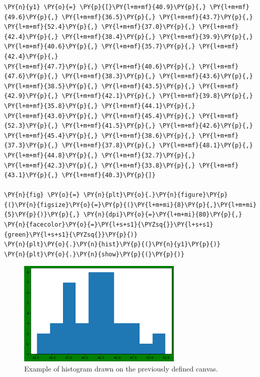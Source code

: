 \begin{tcolorbox}[breakable, size=fbox, boxrule=1pt, pad at break*=1mm,colback=cellbackground, colframe=cellborder]
\begin{Verbatim}[commandchars=\\\{\}]
\PY{n}{y1} \PY{o}{=} \PY{p}{[}\PY{l+m+mf}{40.9}\PY{p}{,} \PY{l+m+mf}{49.6}\PY{p}{,} \PY{l+m+mf}{36.5}\PY{p}{,} \PY{l+m+mf}{43.7}\PY{p}{,} \PY{l+m+mf}{52.4}\PY{p}{,} \PY{l+m+mf}{37.0}\PY{p}{,} \PY{l+m+mf}{42.4}\PY{p}{,} \PY{l+m+mf}{38.4}\PY{p}{,} \PY{l+m+mf}{39.9}\PY{p}{,} \PY{l+m+mf}{40.6}\PY{p}{,} \PY{l+m+mf}{35.7}\PY{p}{,} \PY{l+m+mf}{42.4}\PY{p}{,} 
\PY{l+m+mf}{47.7}\PY{p}{,} \PY{l+m+mf}{40.6}\PY{p}{,} \PY{l+m+mf}{47.6}\PY{p}{,} \PY{l+m+mf}{38.3}\PY{p}{,} \PY{l+m+mf}{43.6}\PY{p}{,} \PY{l+m+mf}{38.5}\PY{p}{,} \PY{l+m+mf}{43.5}\PY{p}{,} \PY{l+m+mf}{42.9}\PY{p}{,} \PY{l+m+mf}{42.1}\PY{p}{,} \PY{l+m+mf}{39.8}\PY{p}{,} \PY{l+m+mf}{35.8}\PY{p}{,} \PY{l+m+mf}{44.1}\PY{p}{,} 
\PY{l+m+mf}{43.0}\PY{p}{,} \PY{l+m+mf}{45.4}\PY{p}{,} \PY{l+m+mf}{52.3}\PY{p}{,} \PY{l+m+mf}{41.5}\PY{p}{,} \PY{l+m+mf}{42.6}\PY{p}{,} \PY{l+m+mf}{45.4}\PY{p}{,} \PY{l+m+mf}{38.6}\PY{p}{,} \PY{l+m+mf}{37.3}\PY{p}{,} \PY{l+m+mf}{37.8}\PY{p}{,} \PY{l+m+mf}{48.1}\PY{p}{,} \PY{l+m+mf}{44.8}\PY{p}{,} \PY{l+m+mf}{32.7}\PY{p}{,} 
\PY{l+m+mf}{42.3}\PY{p}{,} \PY{l+m+mf}{33.8}\PY{p}{,} \PY{l+m+mf}{43.1}\PY{p}{,} \PY{l+m+mf}{40.3}\PY{p}{]}
	
\PY{n}{fig} \PY{o}{=} \PY{n}{plt}\PY{o}{.}\PY{n}{figure}\PY{p}{(}\PY{n}{figsize}\PY{o}{=}\PY{p}{(}\PY{l+m+mi}{8}\PY{p}{,}\PY{l+m+mi}{5}\PY{p}{)}\PY{p}{,} \PY{n}{dpi}\PY{o}{=}\PY{l+m+mi}{80}\PY{p}{,} \PY{n}{facecolor}\PY{o}{=}\PY{l+s+s1}{\PYZsq{}}\PY{l+s+s1}{green}\PY{l+s+s1}{\PYZsq{}}\PY{p}{)}
\PY{n}{plt}\PY{o}{.}\PY{n}{hist}\PY{p}{(}\PY{n}{y1}\PY{p}{)}
\PY{n}{plt}\PY{o}{.}\PY{n}{show}\PY{p}{(}\PY{p}{)}
\end{Verbatim}
\end{tcolorbox}

\begin{figure}[htb]
	\centering
	\includegraphics[width=0.7\textwidth]{figures/histo1}
	\caption{Example of histogram drawn on the previously defined canvas.}
	\label{fig:histo1}
\end{figure}

